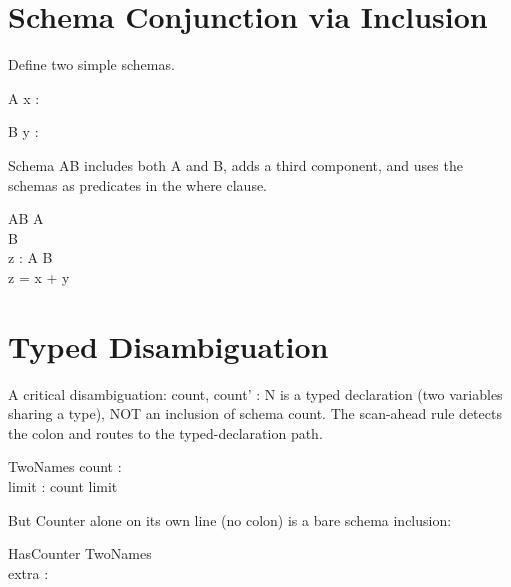\documentclass[a4paper,10pt,fleqn]{article}
\begin{document}
\section*{Schema Conjunction via Inclusion}

\noindent Define two simple schemas.

\bigskip

\begin{schema}{A}
x : \nat
\end{schema}

\begin{schema}{B}
y : \nat
\end{schema}

\noindent Schema AB includes both A and B, adds a third component, and uses the schemas as predicates in the where clause.

\bigskip

\begin{schema}{AB}
A \\
B \\
z : \nat
\where
A \land B \\
z = x + y
\end{schema}

\section*{Typed Disambiguation}

\noindent A critical disambiguation: count, count' : N is a typed declaration (two variables sharing a type), NOT an inclusion of schema count. The scan-ahead rule detects the colon and routes to the typed-declaration path.

\bigskip

\begin{schema}{TwoNames}
count : \nat \\
limit : \nat
\where
count \leq limit
\end{schema}

\noindent But Counter alone on its own line (no colon) is a bare schema inclusion:

\bigskip

\begin{schema}{HasCounter}
TwoNames \\
extra : \nat
\end{schema}
\end{document}

